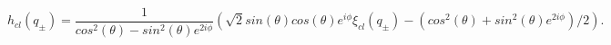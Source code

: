 \begin{equation}
\label{pce}
h_{cl}(q_{\pm}) =
\frac{1}{cos^2(\theta)-sin^2(\theta)e^{2i\phi}}
(\sqrt{2}sin(\theta)cos(\theta)e^{i\phi}\xi_{cl}(q_{\pm}) -
(cos^2(\theta)+sin^2(\theta)e^{2i\phi})/2).
\end{equation}

